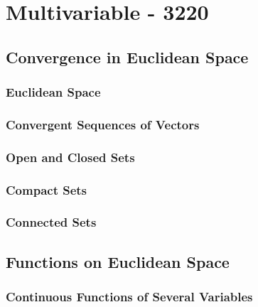 \documentclass[12pt]{book}
\begin{document}
\part{Multivariable - 3220}



\chapter{Convergence in Euclidean Space}
\section{Euclidean Space}


\section{Convergent Sequences of Vectors}


\section{Open and Closed Sets}


\section{Compact Sets}

\section{Connected Sets}



\chapter{Functions on Euclidean Space}
\section{Continuous Functions of Several Variables}


\end{document}

